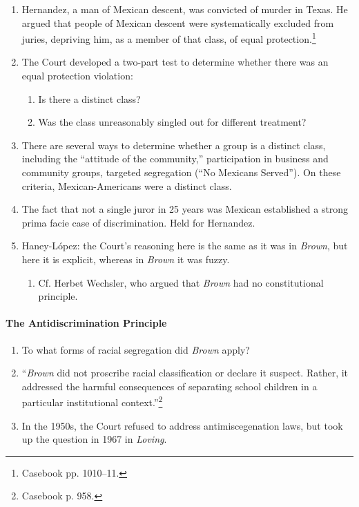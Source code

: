 \begin{enumerate}
    \item Hernandez, a man of Mexican descent, was convicted of murder in 
    Texas. He argued that people of Mexican descent were systematically 
    excluded from juries, depriving him, as a member of that class, of equal 
    protection.\footnote{Casebook pp. 1010--11.}
    \item The Court developed a two-part test to determine whether there was 
    an equal protection violation:
    \begin{enumerate}
        \item Is there a distinct class?
        \item Was the class unreasonably singled out for different treatment?
    \end{enumerate}
    \item There are several ways to determine whether a group is a distinct 
    class, including the ``attitude of the community,'' participation in 
    business and community groups, targeted segregation (``No Mexicans 
    Served''). On these criteria, Mexican-Americans were a distinct class.
    \item The fact that not a single juror in 25 years was Mexican established 
    a strong prima facie case of discrimination. Held for Hernandez.
    \item Haney-L\'{o}pez: the Court's reasoning here is the same as it was in 
    \emph{Brown}, but here it is explicit, whereas in \emph{Brown} it was 
    fuzzy.
    \begin{enumerate}
        \item Cf. Herbet Wechsler, who argued that \emph{Brown} had no 
        constitutional principle.
    \end{enumerate}
\end{enumerate}

\paragraph{The Antidiscrimination Principle}

\begin{enumerate}
    \item To what forms of racial segregation did \emph{Brown} apply?
    \item ``\emph{Brown} did not proscribe racial classification or declare it 
    suspect. Rather, it addressed the harmful consequences of separating 
    school children in a particular institutional context.''\footnote{Casebook 
    p. 958.}
    \item In the 1950s, the Court refused to address antimiscegenation laws, 
    but took up the question in 1967 in \emph{Loving}.
\end{enumerate}

